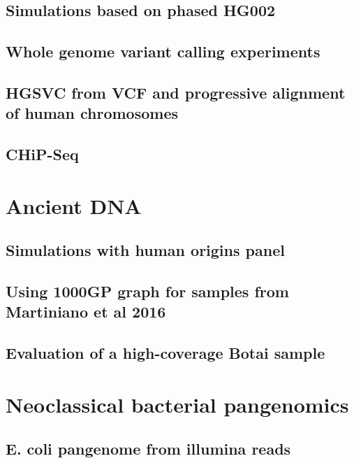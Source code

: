 \subsection{Simulations based on phased HG002}
\label{sec:1000GP_sim}

\subsection{Whole genome variant calling experiments}

\subsection{HGSVC from VCF and progressive alignment of human chromosomes}

\subsection{CHiP-Seq}


\section{Ancient DNA}

\subsection{Simulations with human origins panel}

\subsection{Using 1000GP graph for samples from Martiniano et al 2016}

\subsection{Evaluation of a high-coverage Botai sample}


\section{Neoclassical bacterial pangenomics}

\subsection{E. coli pangenome from illumina reads}

